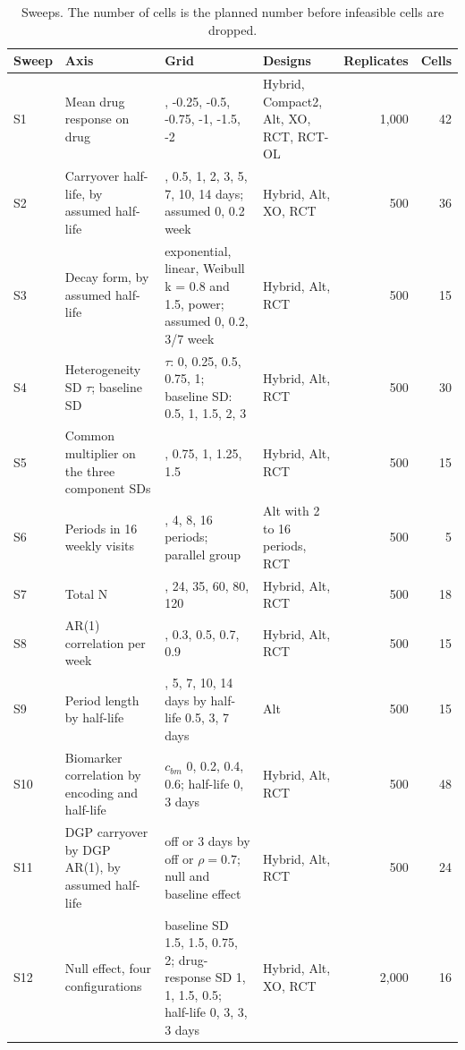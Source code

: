 \documentclass[
  11pt,
]{article}
\begin{document}
\begin{table}
\centering
\caption{\label{tab:sweep-table}Sweeps. The number of cells is the planned number before infeasible cells are dropped.}
\centering
\fontsize{8}{10}\selectfont
\begin{tabular}[t]{l>{\raggedright\arraybackslash}p{3.2cm}>{\raggedright\arraybackslash}p{4.2cm}lrr}
\toprule
Sweep & Axis & Grid & Designs & Replicates & Cells\\
\midrule
S1 & Mean drug response on drug & 0, -0.25, -0.5, -0.75, -1, -1.5, -2 & Hybrid, Compact2, Alt, XO, RCT, RCT-OL & 1,000 & 42\\
S2 & Carryover half-life, by assumed half-life & 0, 0.5, 1, 2, 3, 5, 7, 10, 14 days; assumed 0, 0.2 week & Hybrid, Alt, XO, RCT & 500 & 36\\
S3 & Decay form, by assumed half-life & exponential, linear, Weibull k = 0.8 and 1.5, power; assumed 0, 0.2, 3/7 week & Hybrid, Alt, RCT & 500 & 15\\
S4 & Heterogeneity SD $\tau$; baseline SD & $\tau$: 0, 0.25, 0.5, 0.75, 1; baseline SD: 0.5, 1, 1.5, 2, 3 & Hybrid, Alt, RCT & 500 & 30\\
S5 & Common multiplier on the three component SDs & 0.5, 0.75, 1, 1.25, 1.5 & Hybrid, Alt, RCT & 500 & 15\\
\addlinespace
S6 & Periods in 16 weekly visits & 2, 4, 8, 16 periods; parallel group & Alt with 2 to 16 periods, RCT & 500 & 5\\
S7 & Total N & 16, 24, 35, 60, 80, 120 & Hybrid, Alt, RCT & 500 & 18\\
S8 & AR(1) correlation per week & 0, 0.3, 0.5, 0.7, 0.9 & Hybrid, Alt, RCT & 500 & 15\\
S9 & Period length by half-life & 3, 5, 7, 10, 14 days by half-life 0.5, 3, 7 days & Alt & 500 & 15\\
S10 & Biomarker correlation by encoding and half-life & $c_{bm}$ 0, 0.2, 0.4, 0.6; half-life 0, 3 days & Hybrid, Alt, RCT & 500 & 48\\
\addlinespace
S11 & DGP carryover by DGP AR(1), by assumed half-life & off or 3 days by off or $\rho = 0.7$; null and baseline effect & Hybrid, Alt, RCT & 500 & 24\\
S12 & Null effect, four configurations & baseline SD 1.5, 1.5, 0.75, 2; drug-response SD 1, 1, 1.5, 0.5; half-life 0, 3, 3, 3 days & Hybrid, Alt, XO, RCT & 2,000 & 16\\
\bottomrule
\end{tabular}
\end{table}
\end{document}
